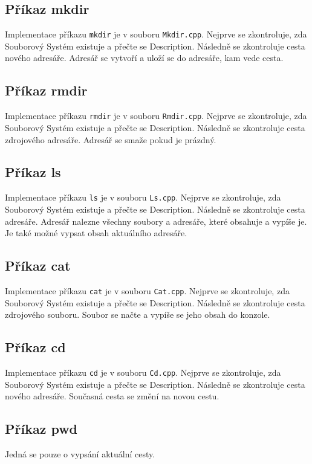 \documentclass[12pt, a4paper]{article}
\begin{document}
\subsection{Příkaz mkdir}
Implementace příkazu \texttt{mkdir} je v souboru \texttt{Mkdir.cpp}.
Nejprve se zkontroluje, zda Souborový Systém existuje a přečte se Description.
Následně se zkontroluje cesta nového adresáře.
Adresář se vytvoří a uloží se do adresáře, kam vede cesta.

\subsection{Příkaz rmdir}
Implementace příkazu \texttt{rmdir} je v souboru \texttt{Rmdir.cpp}.
Nejprve se zkontroluje, zda Souborový Systém existuje a přečte se Description.
Následně se zkontroluje cesta zdrojového adresáře.
Adresář se smaže pokud je prázdný.

\subsection{Příkaz ls}
Implementace příkazu \texttt{ls} je v souboru \texttt{Ls.cpp}.
Nejprve se zkontroluje, zda Souborový Systém existuje a přečte se Description.
Následně se zkontroluje cesta adresáře.
Adresář nalezne všechny soubory a adresáře, které obsahuje a vypíše je.
Je také možné vypsat obsah aktuálního adresáře.

\subsection{Příkaz cat}
Implementace příkazu \texttt{cat} je v souboru \texttt{Cat.cpp}.
Nejprve se zkontroluje, zda Souborový Systém existuje a přečte se Description.
Následně se zkontroluje cesta zdrojového souboru.
Soubor se načte a vypíše se jeho obsah do konzole.

\subsection{Příkaz cd}
Implementace příkazu \texttt{cd} je v souboru \texttt{Cd.cpp}.
Nejprve se zkontroluje, zda Souborový Systém existuje a přečte se Description.
Následně se zkontroluje cesta nového adresáře.
Současná cesta se změní na novou cestu.

\subsection{Příkaz pwd}
Jedná se pouze o vypsání aktuální cesty.
\end{document}
